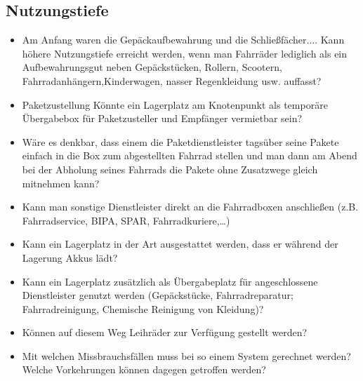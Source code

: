 \subsection{Nutzungstiefe}

\begin{itemize}
  \item Am Anfang waren die Gepäckaufbewahrung und die Schließfächer....
        Kann höhere Nutzungstiefe erreicht werden, wenn man Fahrräder lediglich als ein Aufbewahrungsgut neben Gepäckstücken, Rollern, Scootern, Fahrradanhängern,Kinderwagen, nasser Regenkleidung usw. auffasst?
  \item Paketzustellung
        Könnte ein Lagerplatz am Knotenpunkt als temporäre Übergabebox für Paketzusteller und Empfänger vermietbar sein?
  \item Wäre es denkbar, dass einem die Paketdienstleister tagsüber seine Pakete einfach in die Box zum abgestellten Fahrrad stellen und man dann am Abend bei der Abholung seines Fahrrads die Pakete ohne Zusatzwege gleich mitnehmen kann?
  \item Kann man sonstige Dienstleister direkt an die Fahrradboxen anschließen (z.B. Fahrradservice, BIPA, SPAR, Fahrradkuriere,…)
  \item Kann ein Lagerplatz in der Art ausgestattet werden, dass er während der Lagerung Akkus lädt?
  \item Kann ein Lagerplatz zusätzlich als Übergabeplatz für angeschlossene Dienstleister genutzt werden (Gepäckstücke, Fahrradreparatur; Fahrradreinigung, Chemische Reinigung von Kleidung)?
  \item Können auf diesem Weg Leihräder zur Verfügung gestellt werden?
  \item Mit welchen Missbrauchsfällen muss bei so einem System gerechnet werden? Welche Vorkehrungen können dagegen getroffen werden?
\end{itemize}